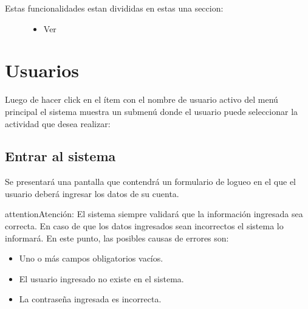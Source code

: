 \documentclass[a4paper,10pt,spanish]{sphinxmanual}
\begin{document}
\begin{description}
\item[{Estas funcionalidades estan divididas en estas una seccion:}] \leavevmode\begin{itemize}
\item {} 
Ver

\end{itemize}

\end{description}


\chapter{Usuarios}
\label{usuarios:usuarios}\label{usuarios::doc}
Luego de hacer click en el ítem con el nombre de usuario activo del menú principal el sistema muestra un submenú donde el usuario puede seleccionar la actividad que desea realizar:


\section{Entrar al sistema}
\label{entraralsistema::doc}\label{entraralsistema:entrar-al-sistema}
Se presentará una pantalla que contendrá un formulario de logueo en el que el usuario deberá ingresar los datos de su cuenta.


\begin{notice}{attention}{Atención:}
El sistema siempre validará que la información ingresada sea correcta. En caso de que los datos ingresados sean incorrectos el sistema lo informará.
En este punto, las posibles causas de errores son:
\begin{itemize}
\item {} 
Uno o más campos obligatorios vacíos.

\item {} 
El usuario ingresado no existe en el sistema.

\item {} 
La contraseña ingresada es incorrecta.

\end{itemize}
\end{notice}
\end{document}
